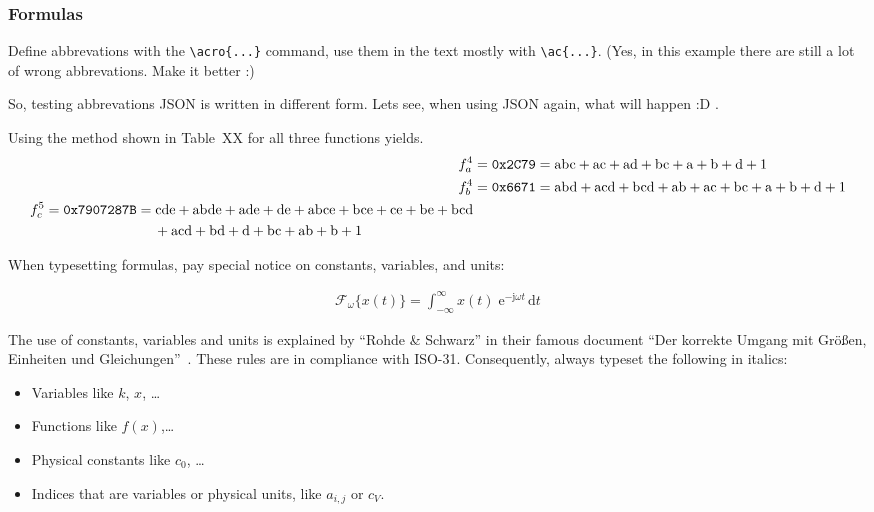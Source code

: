 \subsubsection{Formulas}

Define abbrevations with the \verb+\acro{...}+ command, use them in the text mostly with \verb+\ac{...}+. (Yes, in this example there are still a lot of wrong abbrevations. Make it better :)

So, testing abbrevations \ac{JSON} is written in different form. Lets see, when using \ac{JSON} again, what will happen :D .

Using the method shown in Table~XX for all three functions yields.
\begin{align}
f_a^4 &= \mathrm{\texttt{0x2C79}} = \mathrm{abc} + \mathrm{ac} + \mathrm{ad} + \mathrm{bc} + \mathrm{a} + \mathrm{b} + \mathrm{d} + \mathrm{1} \\
f_b^4 &= \mathrm{\texttt{0x6671}} = \mathrm{abd} + \mathrm{acd} + \mathrm{bcd} + \mathrm{ab} + \mathrm{ac} + \mathrm{bc} + \mathrm{a} + \mathrm{b} + \mathrm{d} + \mathrm{1}\\
\begin{split}
f_c^5 &= \mathrm{\texttt{0x7907287B}} = \mathrm{cde} + \mathrm{abde} + \mathrm{ade} + \mathrm{de} + \mathrm{abce} + \mathrm{bce} + \mathrm{ce} + \mathrm{be} + \mathrm{bcd}\\
&\hspace{2.75cm}+ \mathrm{acd} +\mathrm{bd} + \mathrm{d} + \mathrm{bc} + \mathrm{ab} + \mathrm{b} + \mathrm{1}
\end{split}
\end{align}

When typesetting formulas, pay special notice on constants, variables, and units:

 \begin{align}
  \mathcal{F}_{\omega}\{x(t)\} = \int^{\infty}_{-\infty} x(t) \;\mathrm{e}^{-\mathrm{j} \omega t}\,\mathrm{d}t
  \tag{Fourier-Transformation} %
  \end{align}
  
The use of constants, variables and units is explained by \enquote{Rohde \& Schwarz} in their famous document \enquote{Der korrekte Umgang mit Gr\"{o}\ss{}en, Einheiten und Gleichungen}~\cite{msc:correctuse}. These rules are in compliance with ISO-31. Consequently, always typeset the following in italics:

\begin{itemize}
\item Variables like $k$, $x$, \dots
\item Functions like $f(x)$,\dots
\item Physical constants like $c_0$, \dots
\item Indices that are variables or physical units, like $a_{i, j}$ or $c_V$.
\end{itemize}

